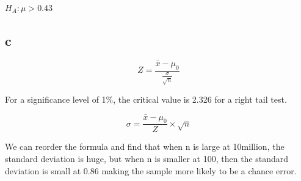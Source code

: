 \documentclass[12pt]{article}
\begin{document}
$H_{A}: \mu>0.43$

\subsection*{c}

\[
    Z = \frac{\bar{x} - \mu_0}{\frac{\sigma}{\sqrt{n}}}
\]

For a significance level of 1\%, the critical value is 2.326 for a right tail
test.

\[
    \sigma = \frac{\bar{x} - \mu_0}{Z} \times \sqrt{n}
\]

We can reorder the formula and find that when n is large at 10million, the
standard deviation is huge, but when n is smaller at 100, then the
standard deviation is small at 0.86 making the sample more likely to be
a chance error.
\end{document}
